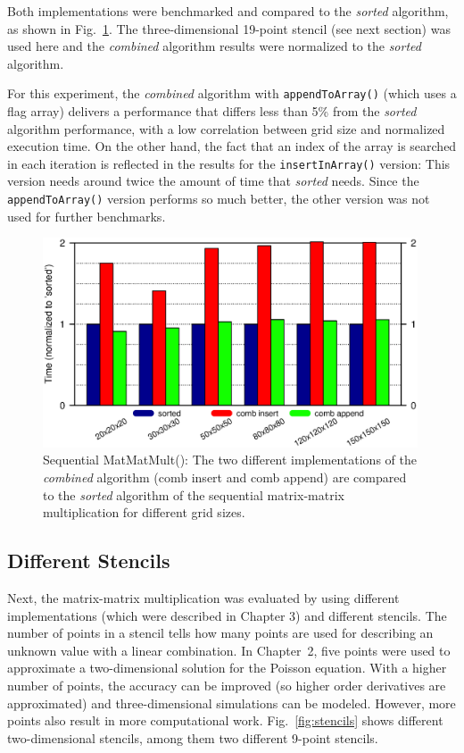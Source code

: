 Both implementations were benchmarked and compared to the \textit{sorted} algorithm, as shown in Fig.~\ref{fig:ex209_insert_append_3d19p}. The three-dimensional 19-point stencil (see next section) was used here and the \textit{combined} algorithm results were normalized to the \textit{sorted} algorithm. 

For this experiment, the \textit{combined} algorithm with \texttt{appendToArray()} (which uses a flag array) delivers a performance that differs less than 5\% from the \textit{sorted} algorithm performance, with a low correlation between grid size and normalized execution time. On the other hand, the fact that an index of the array is searched in each iteration is reflected in the results for the \texttt{insertInArray()} version: This version needs around twice the amount of time that \textit{sorted} needs. Since the \texttt{appendToArray()} version performs so much better, the other version was not used for further benchmarks.

\begin{figure}[tb]
	\centering
	\includegraphics[width=0.99\textwidth, trim={0 2.cm 0 7cm},clip]{seq_insert_append}
	\caption{Sequential MatMatMult(): The two different implementations of the \textit{combined} algorithm (comb insert and comb append) are compared to the \textit{sorted} algorithm of the sequential matrix-matrix multiplication for different grid sizes.} 
	\label{fig:ex209_insert_append_3d19p}
\end{figure}

\subsection{Different Stencils}
Next, the matrix-matrix multiplication was evaluated by using different implementations (which were described in Chapter 3) and different stencils. The number of points in a stencil tells how many points are used for describing an unknown value with a linear combination. In Chapter~2, five points were used to approximate a two-dimensional solution for the Poisson equation. With a higher number of points, the accuracy can be improved (so higher order derivatives are approximated) and three-dimensional simulations can be modeled. However, more points also result in more computational work. Fig.~\ref{fig:stencils} shows different two-dimensional stencils, among them two different 9-point stencils. 

